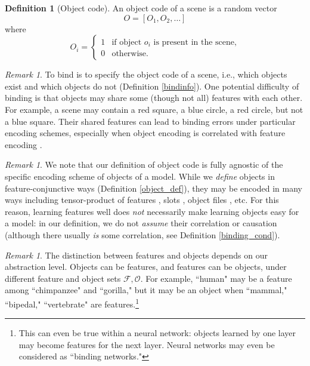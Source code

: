 \documentclass{article}
\theoremstyle{plain}
\theoremstyle{definition}
\newtheorem{definition}[theorem]{Definition}
\theoremstyle{remark}
\newtheorem{remark}[theorem]{Remark}
\begin{document}
\begin{definition}[Object code]
An object code of a scene is a random vector 
\[
O = [O_1, O_2, \dots]
\]
where 
\[
O_i = 
\begin{cases}
1 & \text{if object }o_i\text{ is present in the scene,} \\
0 & \text{otherwise.}
\end{cases}
\]\label{objectcode}
\end{definition}


\begin{remark}
    To bind is to specify the object code of a scene, i.e., which objects exist and which objects do not (Definition \ref{bindinfo}). One potential difficulty of binding is that objects may share some (though not all) features with each other. For example, a scene may contain a red square, a blue circle, a red circle, but not a blue square. Their shared features can lead to binding errors under particular encoding schemes, especially when
    object encoding is correlated with feature encoding \cite{campbell2025understandinglimitsvisionlanguage, greff2020bindingproblemartificialneural, TREISMAN1982107}.
\end{remark}


\begin{remark}
    We note that our definition of object code is fully agnostic of the specific encoding scheme of objects of a model. While we \textit{define} objects in feature-conjunctive ways (Definition \ref{object_def}), they may be encoded in many ways including tensor-product of features \cite{10.1016/0004-3702(90)90007-M}, slots \cite{locatello2020object}, object files \cite{KAHNEMAN1992175}, etc. For this reason, learning features well does \textit{not} necessarily make learning objects easy for a model: in our definition, we do not \textit{assume} their correlation or causation (although there usually \textit{is} some correlation, see Definition \ref{binding_cond}).
\end{remark}

\begin{remark}
    The distinction between features and objects depends on our abstraction level. Objects can be features, and features can be objects, under different feature and object sets $\mathcal{F, O}$. For example, ``human" may be a feature among ``chimpanzee" and ``gorilla," but it may be an object when ``mammal," ``bipedal," ``vertebrate" are features.\footnote{This can even be true within a neural network: objects learned by one layer may become features for the next layer. Neural networks may even be considered as ``binding networks."} 
\end{remark}
\end{document}
